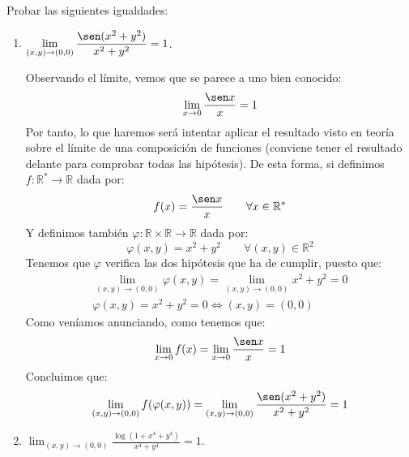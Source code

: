 \begin{ejercicio}
    Probar las siguientes igualdades:
    \begin{enumerate}
        \item $\displaystyle \lim_{(x,y)\to (0,0)} \frac{\sen(x^2 + y^2)}{x^2+y^2} = 1$.

            Observando el límite, vemos que se parece a uno bien conocido:
            \begin{equation*}
                \lim_{x\to0}\dfrac{\sen x}{x} = 1
            \end{equation*}
            Por tanto, lo que haremos será intentar aplicar el resultado visto en teoría sobre el límite de una composición de funciones (conviene tener el resultado delante para comprobar todas las hipótesis). De esta forma, si definimos $f:\mathbb{R}^\ast\to \mathbb{R}$ dada por:
            \begin{equation*}
                f(x) = \dfrac{\sen x}{x} \qquad \forall x\in \mathbb{R}^\ast
            \end{equation*}
            Y definimos también $\varphi:\mathbb{R}\times \mathbb{R}\to \mathbb{R}$ dada por:
            \begin{equation*}
                \varphi(x,y) = x^2+y^2 \qquad \forall (x,y)\in \mathbb{R}^2
            \end{equation*}
            Tenemos que $\varphi$ verifica las dos hipótesis que ha de cumplir, puesto que:
            \begin{gather*}
                \lim_{(x,y)\to(0,0)}\varphi(x,y) = \lim_{(x,y)\to(0,0)}x^2+y^2=  0 \\
                \varphi(x,y) = x^2+y^2 = 0 \Longleftrightarrow (x,y) = (0,0)
            \end{gather*}
            Como veníamos anunciando, como tenemos que:
            \begin{equation*}
                \lim_{x\to0}f(x) = \lim_{x\to0}\dfrac{\sen x}{x} = 1
            \end{equation*}
            Concluimos que:
            \begin{equation*}
                \lim_{(x,y)\to(0,0)} f(\varphi(x,y)) = \lim_{(x,y)\to(0,0)}\dfrac{\sen(x^2+y^2)}{x^2+y^2} = 1
            \end{equation*}
        \item $\displaystyle \lim_{(x,y)\to (0,0)} \frac{\log(1+x^4 + y^4)}{x^4+y^4} = 1$.


\end{enumerate}
\end{ejercicio}
